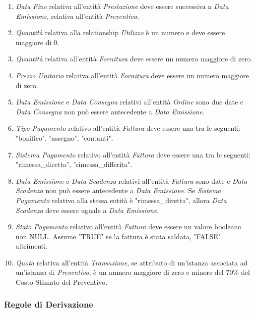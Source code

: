 \begin{enumerate}
				\item \emph{Data Fine} relativa all'entità \emph{Prestazione} deve essere successiva a \emph{Data Emissione}, relativa all'entità \emph{Preventivo}.
				
				\item \emph{Quantità} relativa alla relationship \emph{Utilizzo} è un numero e deve essere maggiore di 0.
				
				\item \emph{Quantità} relativa all'entità \emph{Fornitura} deve essere un numero maggiore di zero.
				\item \emph{Prezzo Unitario} relativa all'entità \emph{Fornitura} deve essere un numero maggiore di zero.
				
				\item \emph{Data Emissione} e \emph{Data Consegna} relativi all'entità \emph{Ordine} sono due date e \emph{Data Consegna} non può essere antecedente a \emph{Data Emissione}.
				
				\item \emph{Tipo Pagamento} relativo all'entità \emph{Fattura} deve essere una tra le seguenti: "bonifico", "assegno", "contanti".
				\item \emph{Sistema Pagamento} relativo all'entità \emph{Fattura} deve essere una tra le seguenti: "rimessa\_diretta", "rimessa\_differita".
				\item \emph{Data Emissione} e \emph{Data Scadenza} relativi all'entità \emph{Fattura} sono date e \emph{Data Scadenza} non può essere antecedente a \emph{Data Emissione}. Se \emph{Sistema Pagamento} relativo alla stessa entità è "rimessa\_diretta", allora \emph{Data Scadenza} deve essere uguale a \emph{Data Emissione}.
				\item \emph{Stato Pagamento} relativo all’entità \emph{Fattura} deve essere un valore booleano non NULL. Assume "TRUE" se la fattura è stata saldata, "FALSE" altrimenti.
				
				\item \emph{Quota} relativa all'entità \emph{Transazione}, se attributo di un'istanza associata ad un'istanza di \emph{Preventivo}, è un numero maggiore di zero e minore del 70\% del Costo Stimato del Preventivo.
				
			\end{enumerate}
		
		\subsubsection{Regole di Derivazione}
		
